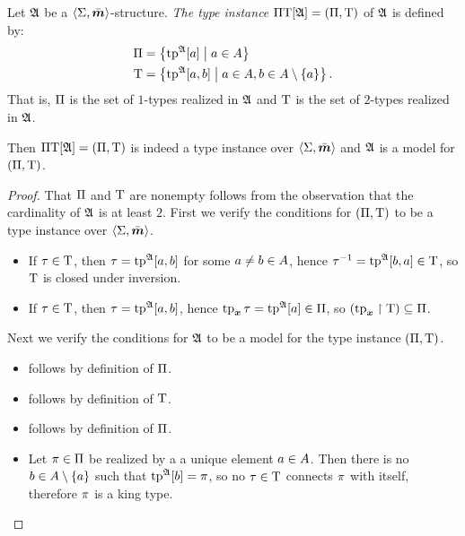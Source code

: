 \begin{definition}
Let $\mathfrak{A}$ be a $\left\langle \mathrm{\Sigma},\bar{\bm{m}} \right\rangle$-structure.
\emph{The type instance} $\Pi\mathrm{T}[\mathfrak{A}] = (\Pi,\mathrm{T})$ of $\mathfrak{A}$ is
defined by:
\begin{align*}
  \Pi &= \left\{\operatorname{tp}^{\mathfrak{A}}[a]\mathrel{}\middle|\mathrel{}a \in A\right\} \\
  \mathrm{T} &= \left\{\operatorname{tp}^{\mathfrak{A}}[a,b]\mathrel{}\middle|\mathrel{}a \in A, b \in A \setminus \left\{a\right\}\right\}.
\end{align*}
That is, $\Pi$ is the set of $1$-types realized in $\mathfrak{A}$ and $\mathrm{T}$ is the
set of $2$-types realized in $\mathfrak{A}$.
\end{definition}
\begin{remark}\label{rem:tpi-str}
Then $\Pi\mathrm{T}[\mathfrak{A}] = (\Pi,\mathrm{T})$ is indeed a type instance over
$\left\langle \mathrm{\Sigma},\bar{\bm{m}} \right\rangle$ and $\mathfrak{A}$ is a model for $(\Pi,\mathrm{T})$.
\end{remark}
\begin{proof} 
That $\Pi$ and $\mathrm{T}$ are nonempty follows from the observation that the
cardinality of $\mathfrak{A}$ is at least $2$.
First we verify the conditions for $(\Pi,\mathrm{T})$ to be a type instance over
$\left\langle \mathrm{\Sigma},\bar{\bm{m}} \right\rangle$.
\begin{itemize}
  \item[\refcondtpii]
  If $\tau \in \mathrm{T}$, then $\tau = \operatorname{tp}^{\mathfrak{A}}[a,b]$ for
  some $a \neq b \in A$, hence $\tau^{-1} = \operatorname{tp}^{\mathfrak{A}}[b,a] \in
  \mathrm{T}$, so $\mathrm{T}$ is closed under inversion.
  \item[\refcondtpic]
  If $\tau \in \mathrm{T}$, then $\tau = \operatorname{tp}^{\mathfrak{A}}[a,b]$, hence
  $\operatorname{tp}_{\bm{x}}\tau = \operatorname{tp}^{\mathfrak{A}}[a] \in \Pi$, so $(\operatorname{tp}_{\bm{x}}\restriction\mathrm{T}) \subseteq
  \Pi$.
\end{itemize}
Next we verify the conditions for $\mathfrak{A}$ to be a model for the type instance
$(\Pi,\mathrm{T})$.
\begin{itemize}
  \item[\refcondrealizI] follows by definition of $\Pi$.
  \item[\refcondrealizII] follows by definition of $\mathrm{T}$.
  \item[\refcondrealizp] follows by definition of $\Pi$.
  \item[\refcondrealizk] Let $\pi \in \Pi$ be realized by a a unique element
  $a \in A$. Then there is no $b \in A \setminus \left\{a\right\}$ such that
  $\operatorname{tp}^{\mathfrak{A}}[b] = \pi$, so no $\tau \in \mathrm{T}$ connects $\pi$ with itself, therefore $\pi$ is a king
  type.
\end{itemize}
\end{proof}


